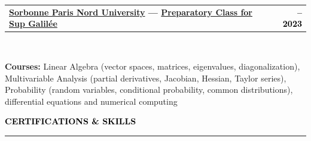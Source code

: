 \documentclass[10pt,english,french]{article}
\makeatletter
\newcommand{\certificateIcon}[1][black]{\textcolor{#1}{\faClipboard}}
\newlength{\mpwidth}
\newcommand{\cvsection}[1]{
    \vspace{4pt}
    \textbf{\fontsize{9pt}{10pt}\selectfont \textcolor{black}{#1}}
    \vspace{6pt}
    \hrule
    \vspace{6pt}
}
\newcommand{\cvtextnotab}[1]{
    \parbox{1\mpwidth}{#1}
}
\newcommand{\cvevent}[2]{
    \vspace{2pt}
    \parbox{\mpwidth}{
        \begin{tabular*}{1\mpwidth}{@{\extracolsep{\fill}} l r}
            \textcolor{black}{\textbf{\fontsize{11}{12}\selectfont #1}} & \textcolor{black}{\textbf{\fontsize{12}{12}\selectfont #2}} \\
        \end{tabular*}\\[-8pt] %
    }
}
\newcommand{\cvsubevent}[2]{
    \parbox{\mpwidth}{
        \begin{tabular*}{1\mpwidth}{@{\extracolsep{\fill}} l r}
            \textcolor{black}{\textit{\fontsize{10}{12}\selectfont #1}} & \textcolor{black}{\textit{\fontsize{10}{12}\selectfont #2}} \\
        \end{tabular*}\\[-8pt] %
    }
    \vspace{-10pt}
}
\makeatother
\begin{document}


\vspace{-10pt}
\noindent{\textcolor{middle_light_gray}{\rule{\mpwidth}{0.2pt}}}
\vspace{-15pt}

\cvevent{\href{https://www.univ-spn.fr}{Sorbonne Paris Nord University} --- \href{https://www.sup-galilee.univ-paris13.fr/index.php/formation/cp2i/}{Preparatory Class for \textbf{Sup Galilée}}}{\fontsize{11pt}{11pt}\selectfont 2021\hspace{5pt}--\hspace{5pt}2023}

\vspace{-10pt}
\cvtextnotab{
    \textbf{Courses\!:}
    Linear Algebra (vector spaces, matrices, eigenvalues, diagonalization),
    Multivariable Analysis (partial derivatives, Jacobian, Hessian, Taylor series),
    Probability (random variables, conditional probability, common distributions),
    differential equations and numerical computing
}



\vspace{-8pt}
\cvsection{\certificateIcon[black]\hspace{4pt}CERTIFICATIONS \& SKILLS}
\end{document}

